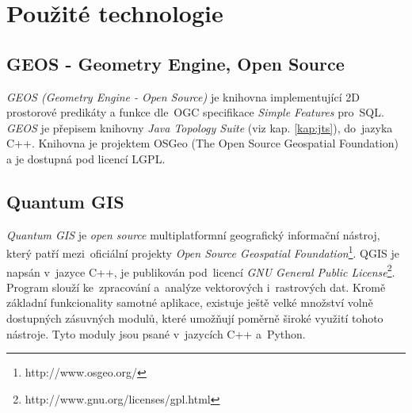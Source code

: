 \chapter{Použité technologie}
\label{4-technologie}


\section{GEOS - Geometry Engine, Open Source}
\label{geos}

\textit{GEOS (Geometry Engine - Open Source)} je knihovna implementující 2D 
prostorové predikáty a funkce dle~OGC specifikace \textit{Simple Features} 
pro~SQL. \textit{GEOS} je přepisem knihovny \textit{Java Topology Suite} 
(viz kap. \ref{kap:jts}), do~jazyka C++. Knihovna je projektem OSGeo 
(The Open Source Geospatial Foundation) a je dostupná pod licencí LGPL.

% 

\section{Quantum GIS}
\label{qgis}

\textit{Quantum GIS} je \textit{open source} multiplatformní geografický 
informační nástroj, který patří mezi~oficiální projekty \textit{Open Source 
Geospatial Foundation}\footnote{http://www.osgeo.org/}. QGIS je 
napsán v~jazyce C++, je publikován pod~licencí \textit{GNU General Public 
License}\footnote{http://www.gnu.org/licenses/gpl.html}. Program slouží 
ke~zpracování a~analýze vektorových i~rastrových dat. Kromě základní 
funkcionality samotné aplikace, existuje ještě velké množství volně 
dostupných zásuvných modulů, které umožňují poměrně široké využití 
tohoto nástroje. Tyto moduly jsou psané v~jazycích C++ a~Python.

